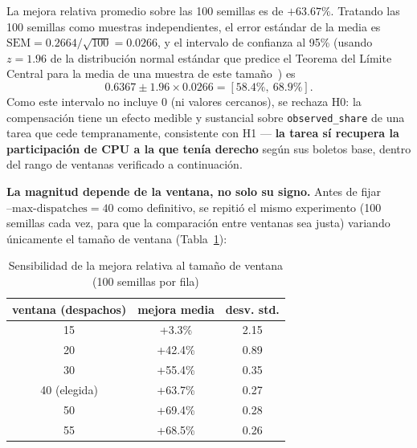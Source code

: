 La mejora relativa promedio sobre las 100 semillas es de $+63.67\%$. Tratando
las 100 semillas como muestras independientes, el error estándar de la
media es $\text{SEM} = 0.2664/\sqrt{100} = 0.0266$, y el intervalo de
confianza al 95\% (usando $z=1.96$ de la distribución normal estándar que
predice el Teorema del Límite Central para la media de una muestra de este
tamaño~\cite{NISTCSRCCLT, Lu2020, CrabillMaurer2023}) es
\[
  0.6367 \pm 1.96 \times 0.0266 = [58.4\%,\ 68.9\%].
\]
Como este intervalo no incluye 0 (ni valores cercanos), se rechaza H0: la
compensación tiene un efecto medible y sustancial sobre
\texttt{observed\_share} de una tarea que cede tempranamente, consistente
con H1 --- \textbf{la tarea sí recupera la participación de CPU a la que
tenía derecho} según sus boletos base, dentro del rango de ventanas
verificado a continuación.

\textbf{La magnitud depende de la ventana, no solo su signo.} Antes de
fijar $\text{--max-dispatches}=40$ como definitivo, se repitió el mismo
experimento (100 semillas cada vez, para que la comparación entre ventanas
sea justa) variando únicamente el tamaño de ventana (Tabla~\ref{tab:extension-sensibilidad}):

\begin{table}[htbp]
\caption{Sensibilidad de la mejora relativa al tamaño de ventana (100
semillas por fila)}
\label{tab:extension-sensibilidad}
\centering
\begin{tabular}{ccc}
\toprule
ventana (despachos) & mejora media & desv. std. \\
\midrule
15 & +3.3\% & 2.15 \\
20 & +42.4\% & 0.89 \\
30 & +55.4\% & 0.35 \\
40 (elegida) & +63.7\% & 0.27 \\
50 & +69.4\% & 0.28 \\
55 & +68.5\% & 0.26 \\
\bottomrule
\end{tabular}
\end{table}

